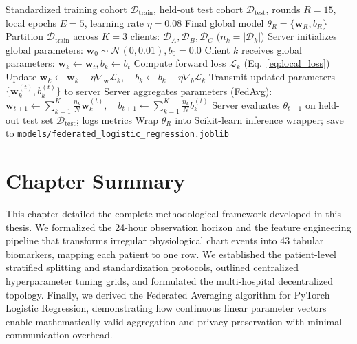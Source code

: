 \begin{algorithm}[htbp]
\caption{Federated Averaging (FedAvg) Clinical Training Pipeline}
\label{alg:federated}
\begin{algorithmic}[1]
\REQUIRE Standardized training cohort $\mathcal{D}_{\text{train}}$, held-out test cohort $\mathcal{D}_{\text{test}}$, rounds $R=15$, local epochs $E=5$, learning rate $\eta=0.08$
\ENSURE Final global model $\theta_R = \{\mathbf{w}_R, b_R\}$
\STATE Partition $\mathcal{D}_{\text{train}}$ across $K=3$ clients: $\mathcal{D}_A, \mathcal{D}_B, \mathcal{D}_C$ ($n_k = |\mathcal{D}_k|$)
\STATE Server initializes global parameters: $\mathbf{w}_0 \sim \mathcal{N}(0, 0.01), b_0 = 0.0$
        \STATE Client $k$ receives global parameters: $\mathbf{w}_k \leftarrow \mathbf{w}_t, b_k \leftarrow b_t$
                \STATE Compute forward loss $\mathcal{L}_k$ (Eq.~\ref{eq:local_loss})
                \STATE Update $\mathbf{w}_k \leftarrow \mathbf{w}_k - \eta \nabla_{\mathbf{w}} \mathcal{L}_k, \quad b_k \leftarrow b_k - \eta \nabla_{b} \mathcal{L}_k$
            \ENDFOR
        \ENDFOR
        \STATE Transmit updated parameters $\{\mathbf{w}_k^{(t)}, b_k^{(t)}\}$ to server
    \ENDFOR
    \STATE Server aggregates parameters (FedAvg):
    \STATE $\mathbf{w}_{t+1} \leftarrow \sum_{k=1}^K \frac{n_k}{N} \mathbf{w}_k^{(t)}, \quad b_{t+1} \leftarrow \sum_{k=1}^K \frac{n_k}{N} b_k^{(t)}$
    \STATE Server evaluates $\theta_{t+1}$ on held-out test set $\mathcal{D}_{\text{test}}$; logs metrics
\ENDFOR
\STATE Wrap $\theta_R$ into Scikit-learn inference wrapper; save to \texttt{models/federated\_logistic\_regression.joblib}
\end{algorithmic}
\end{algorithm}

\section{Chapter Summary}
\label{sec:chapter4_summary}

This chapter detailed the complete methodological framework developed in this thesis. We formalized the 24-hour observation horizon and the feature engineering pipeline that transforms irregular physiological chart events into 43 tabular biomarkers, mapping each patient to one row. We established the patient-level stratified splitting and standardization protocols, outlined centralized hyperparameter tuning grids, and formulated the multi-hospital decentralized topology. Finally, we derived the Federated Averaging algorithm for PyTorch Logistic Regression, demonstrating how continuous linear parameter vectors enable mathematically valid aggregation and privacy preservation with minimal communication overhead.

